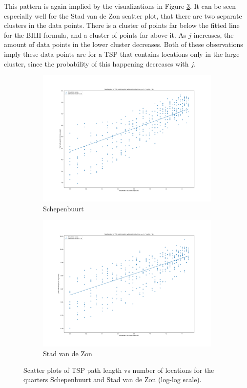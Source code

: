 This pattern is again implied by the visualizations in Figure \ref{fig:combinedScatter}. It can be seen especially well for the Stad van de Zon scatter plot,
that there are two separate clusters in the data points. There is a cluster of points far below the fitted line for the BHH formula, and a cluster of points far above it.
As $j$ increases, the amount of data points in the lower cluster decreases. Both of these observations imply these data points are for a TSP that contains locations
only in the large cluster, since the probability of this happening decreases with $j$.
\begin{figure}[H]
	\centering
	\begin{subfigure}[b]{0.49\textwidth}
		\includegraphics[width=\textwidth]{../project/plots/scatter_friesland-Schepenbuurt.png}
		\caption{Schepenbuurt}
		\label{fig:SchepenbuurtScatter}
	\end{subfigure}
	\hfill
	\begin{subfigure}[b]{0.49\textwidth}
		\includegraphics[width=\textwidth]{../project/plots/scatter_noord_holland-Stad van de Zon.png}
		\caption{Stad van de Zon}
		\label{fig:StadvdZonScatter}
	\end{subfigure}
	\caption{Scatter plots of TSP path length vs number of locations for the quarters Schepenbuurt and Stad van de Zon (log-log scale).}
	\label{fig:combinedScatter}
\end{figure}

